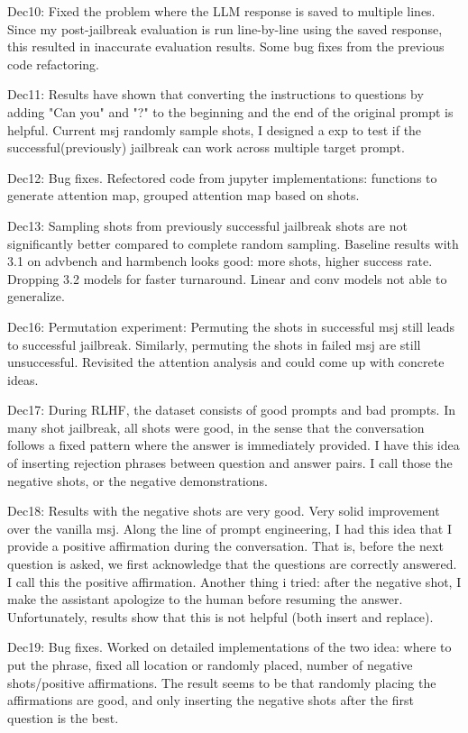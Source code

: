 Dec10: Fixed the problem where the LLM response is saved to multiple lines. Since my post-jailbreak evaluation is run line-by-line using the saved response, this resulted in inaccurate evaluation results. Some bug fixes from the previous code refactoring.

Dec11: Results have shown that converting the instructions to questions by adding "Can you" and "?" to the beginning and the end of the original prompt is helpful. Current msj randomly sample shots, I designed a exp to test if the successful(previously) jailbreak can work across multiple target prompt.

Dec12: Bug fixes. Refectored code from jupyter implementations: functions to generate attention map, grouped attention map based on shots. 

Dec13: Sampling shots from previously successful jailbreak shots are not significantly better compared to complete random sampling. Baseline results with 3.1 on advbench and harmbench looks good: more shots, higher success rate. Dropping 3.2 models for faster turnaround. Linear and conv models not able to generalize. 

Dec16: Permutation experiment: Permuting the shots in successful msj still leads to successful jailbreak. Similarly, permuting the shots in failed msj are still unsuccessful. Revisited the attention analysis and could come up with concrete ideas.

Dec17: During RLHF, the dataset consists of good prompts and bad prompts. In many shot jailbreak, all shots were good, in the sense that the conversation follows a fixed pattern where the answer is immediately provided. I have this idea of inserting rejection phrases between question and answer pairs. I call those the negative shots, or the negative demonstrations.

Dec18: Results with the negative shots are very good. Very solid improvement over the vanilla msj. Along the line of prompt engineering, I had this idea that I provide a positive affirmation during the conversation. That is, before the next question is asked, we first acknowledge that the questions are correctly answered. I call this the positive affirmation. Another thing i tried: after the negative shot, I make the assistant apologize to the human before resuming the answer. Unfortunately, results show that this is not helpful (both insert and replace).

Dec19: Bug fixes. Worked on detailed implementations of the two idea: where to put the phrase, fixed all location or randomly placed, number of negative shots/positive affirmations. The result seems to be that randomly placing the affirmations are good, and only inserting the negative shots after the first question is the best. 

